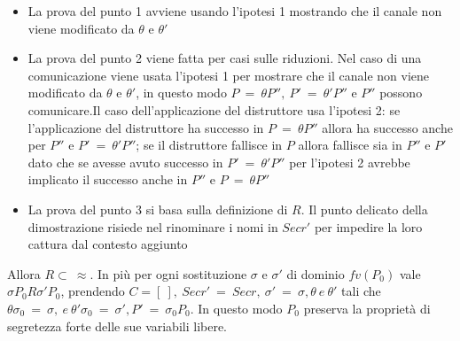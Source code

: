\documentclass[12pt]{article}
\begin{document}
\begin{itemize}
    \item La prova del punto 1 avviene usando l'ipotesi 1 mostrando che il canale non viene modificato da $\theta$ e $\theta'$
    \item La prova del punto 2 viene fatta per casi sulle riduzioni. Nel caso di una comunicazione viene usata l'ipotesi 1 per mostrare che il canale non viene modificato da $\theta$ e $\theta'$, in questo modo $ P\ =\ \theta P'',\ P'\ =\ \theta'P'' $ e $P''$ possono comunicare.Il caso dell'applicazione del distruttore usa l'ipotesi 2: se l'applicazione del distruttore ha successo in $P\ =\ \theta P''$ allora ha successo anche per $P''$ e $P'\ =\ \theta'P''$; se il distruttore fallisce in $P$ allora fallisce sia in $P''$ e $P'$ dato che se avesse avuto successo in $P'\ =\ \theta'P''$ per l'ipotesi 2 avrebbe implicato il successo anche in $P''$ e $P\ =\ \theta P''$
    \item La prova del punto 3 si basa sulla definizione di $R$. Il punto delicato della dimostrazione risiede nel rinominare i nomi in $Secr'$ per impedire la loro cattura dal contesto aggiunto
\end{itemize}
Allora $R \subset \ \approx$. In più per ogni sostituzione $\sigma$ e $\sigma'$ di dominio $fv(P_0)$ vale $\sigma P_0 R \sigma'P_0$, prendendo $C=[\ ],\ Secr'\ =\ Secr,\ \sigma'\ =\ \sigma, \theta \ e\ \theta'$ tali che $\theta \sigma_0 \ =\ \sigma,\ e\ \theta'\sigma_0\ =\ \sigma', P'\ =\ \sigma_0 P_0$. In questo modo $P_0$ preserva la proprietà di segretezza forte delle sue variabili libere.
\end{document}
